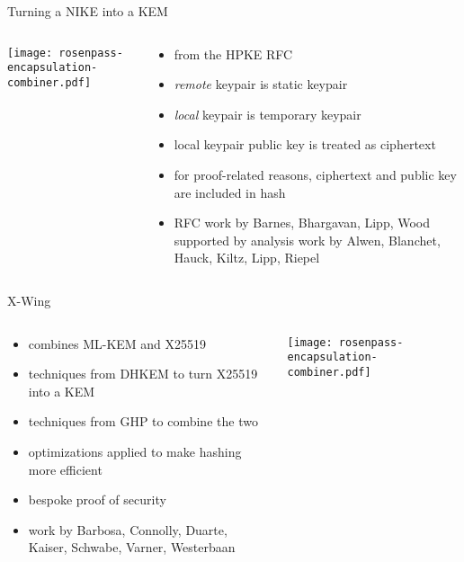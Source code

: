 \begin{frame}{Turning a NIKE into a KEM}
  \begin{columns}[c]
    \begin{column}{.55\linewidth}
    \texttt{[image: rosenpass-encapsulation-combiner.pdf]}
    \end{column}%
    \begin{column}{.45\linewidth}
      \small
      \begin{itemize}
        \item from the HPKE RFC~\citeHpke
        \item \emph{remote} keypair is static keypair
        \item \emph{local} keypair is temporary keypair
        \item local keypair public key is treated as ciphertext
        \item for proof-related reasons, ciphertext and public key
          are included in hash
        \item RFC work by Barnes, Bhargavan, Lipp, Wood supported by
          analysis work by Alwen, Blanchet, Hauck, Kiltz, Lipp, Riepel~\citeHpke
      \end{itemize}
    \end{column}
  \end{columns}
\end{frame}

\begin{frame}{X-Wing \citeXwing}
  \begin{columns}[c]
    \begin{column}{.4\linewidth}
      \small
      \begin{itemize}
        \item combines ML-KEM and X25519
        \item techniques from DHKEM to turn X25519 into a KEM
        \item techniques from GHP to combine the two
        \item optimizations applied to make hashing more efficient
        \item bespoke proof of security
        \item work by Barbosa, Connolly, Duarte, Kaiser, Schwabe, Varner, Westerbaan~\citeXwing
      \end{itemize}
    \end{column}
    \begin{column}{.55\linewidth}
      \texttt{[image: rosenpass-encapsulation-combiner.pdf]}
    \end{column}

  \end{columns}
\end{frame}

